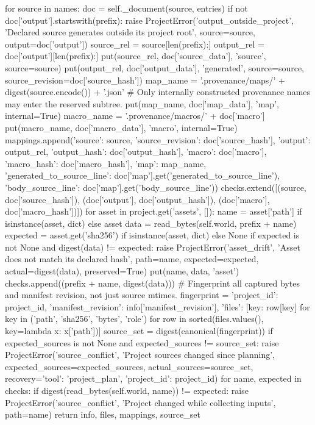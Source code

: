        for source in names:
            doc = self._document(source, entries)
            if not doc['output'].startswith(prefix):
                raise ProjectError('output_outside_project', 'Declared source generates outside its project root',
                                   source=source, output=doc['output'])
            source_rel = source[len(prefix):]
            output_rel = doc['output'][len(prefix):]
            put(source_rel, doc['source_data'], 'source', source=source)
            put(output_rel, doc['output_data'], 'generated', source=source,
                source_revision=doc['source_hash'])
            map_name = '.provenance/maps/' + digest(source.encode()) + '.json'
            # Only internally constructed provenance names may enter the reserved subtree.
            put(map_name, doc['map_data'], 'map', internal=True)
            macro_name = '.provenance/macros/' + doc['macro']
            put(macro_name, doc['macro_data'], 'macro', internal=True)
            mappings.append({'source': source, 'source_revision': doc['source_hash'],
                             'output': output_rel, 'output_hash': doc['output_hash'],
                             'macro': doc['macro'], 'macro_hash': doc['macro_hash'],
                             'map': map_name,
                             'generated_to_source_line': doc['map'].get('generated_to_source_line'),
                             'body_source_line': doc['map'].get('body_source_line')})
            checks.extend([(source, doc['source_hash']), (doc['output'], doc['output_hash']),
                           (doc['macro'], doc['macro_hash'])])
        for asset in project.get('assets', []):
            name = asset['path'] if isinstance(asset, dict) else asset
            data = read_bytes(self.world, prefix + name)
            expected = asset.get('sha256') if isinstance(asset, dict) else None
            if expected is not None and digest(data) != expected:
                raise ProjectError('asset_drift', 'Asset does not match its declared hash', path=name,
                                   expected=expected, actual=digest(data), preserved=True)
            put(name, data, 'asset')
            checks.append((prefix + name, digest(data)))
        # Fingerprint all captured bytes and manifest revision, not just source mtimes.
        fingerprint = {'project_id': project_id, 'manifest_revision': info['manifest_revision'],
                       'files': [{key: row[key] for key in ('path', 'sha256', 'bytes', 'role')}
                                 for row in sorted(files.values(), key=lambda x: x['path'])]}
        source_set = digest(canonical(fingerprint))
        if expected_sources is not None and expected_sources != source_set:
            raise ProjectError('source_conflict', 'Project sources changed since planning',
                               expected_sources=expected_sources, actual_sources=source_set,
                               recovery={'tool': 'project_plan', 'project_id': project_id})
        for name, expected in checks:
            if digest(read_bytes(self.world, name)) != expected:
                raise ProjectError('source_conflict', 'Project changed while collecting inputs', path=name)
        return info, files, mappings, source_set

